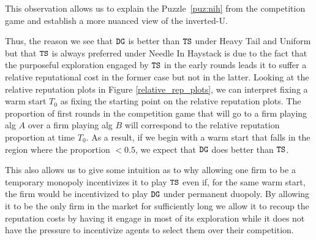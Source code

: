 \documentclass[../competing_bandits.tex]{subfiles}
\begin{document}
This observation allows us to explain the Puzzle~\ref{puz:nih} from the competition game and establish a more nuanced view of the inverted-U.


Thus, the reason we see that $\mathtt{DG}$ is better than $\mathtt{TS}$ under Heavy Tail and Uniform but that $\mathtt{TS}$ is always preferred under Needle In Haystack is due to the fact that the purposeful exploration engaged by $\mathtt{TS}$ in the early rounds leads it to suffer a relative reputational cost in the former case but not in the latter. Looking at the relative reputation plots in Figure \ref{relative_rep_plots}, we can interpret fixing a warm start $T_0$ as fixing the starting point on the relative reputation plots. The proportion of first rounds in the competition game that will go to a firm playing alg $A$ over a firm playing alg $B$ will correspond to the relative reputation proportion at time $T_0$. As a result, if we begin with a warm start that falls in the region where the proportion $< 0.5$, we expect that $\mathtt{DG}$ does better than $\mathtt{TS}$.

This also allows us to give some intuition as to why allowing one firm to be a temporary monopoly incentivizes it to play $\mathtt{TS}$ even if, for the same warm start, the firm would be incentivized to play $\mathtt{DG}$ under permanent duopoly.  By allowing it to be the only firm in the market for sufficiently long we allow it to recoup the reputation costs by having it engage in most of its exploration while it does not have the pressure to incentivize agents to select them over their competition.
\end{document}
